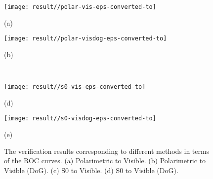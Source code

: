\documentclass[10pt,twocolumn,letterpaper]{article}
\begin{document}
 \begin{figure*}[htp]
 	\centering
 	\begin{minipage}{.4\textwidth}
 			\centering
 			\texttt{[image: result//polar-vis-eps-converted-to]}
 			\captionsetup{labelformat=empty}
 			\captionsetup{justification=centering}
 			\caption*{(a)}
 	\end{minipage}
 	\begin{minipage}{.4\textwidth}
 		\centering
 			\texttt{[image: result//polar-visdog-eps-converted-to]}
 		\captionsetup{labelformat=empty}
 		\captionsetup{justification=centering}
 		\caption*{(b)}
 	\end{minipage}	\\
 	\begin{minipage}{.4\textwidth}
 			\centering
 			\texttt{[image: result//s0-vis-eps-converted-to]}
 			\captionsetup{labelformat=empty}
 			\captionsetup{justification=centering}
 			\caption*{(d)}
 	\end{minipage}
 	\begin{minipage}{.4\textwidth}
 		\centering
 			\texttt{[image: result//s0-visdog-eps-converted-to]}
 		\captionsetup{labelformat=empty}
 		\captionsetup{justification=centering}
 		\caption*{(e)}
 	\end{minipage}
	 	\vskip -8pt\caption{The verification results corresponding to different methods in terms of the ROC curves. (a) Polarimetric to Visible.  (b)  Polarimetric to Visible (DoG). (c)  S0 to Visible. (d)  S0 to Visible (DoG).} \label{fig:roc}
 \end{figure*}
\end{document}
